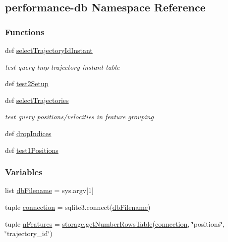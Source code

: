 \hypertarget{namespaceperformance-db}{\subsection{performance-\/db Namespace Reference}
\label{namespaceperformance-db}
}
\subsubsection*{Functions}
\begin{DoxyCompactItemize}
\item 
def \hyperlink{namespaceperformance-db_ac6a284a717787bb2e2296d0caed4918c}{select\-Trajectory\-Id\-Instant}
\begin{DoxyCompactList}\small\item\em test query tmp trajectory instant table \end{DoxyCompactList}\item 
def \hyperlink{namespaceperformance-db_a90fd7556b57603a7d6b053fca334b2ba}{test2\-Setup}
\item 
def \hyperlink{namespaceperformance-db_ac263eb3c8de7eb683d43f0dc6554c7ec}{select\-Trajectories}
\begin{DoxyCompactList}\small\item\em test query positions/velocities in feature grouping \end{DoxyCompactList}\item 
def \hyperlink{namespaceperformance-db_a0a1e5bdd6869001c58701fed27c1a2cd}{drop\-Indices}
\item 
def \hyperlink{namespaceperformance-db_abc61c091eb9ceede04cb3a27f0b774aa}{test1\-Positions}
\end{DoxyCompactItemize}
\subsubsection*{Variables}
\begin{DoxyCompactItemize}
\item 
list \hyperlink{namespaceperformance-db_a283e8388225ac72bea1f9a5b9b7f5ba9}{db\-Filename} = sys.\-argv\mbox{[}1\mbox{]}
\item 
tuple \hyperlink{namespaceperformance-db_ad99932ac08836faca786064c2cc433ee}{connection} = sqlite3.\-connect(\hyperlink{namespaceperformance-db_a283e8388225ac72bea1f9a5b9b7f5ba9}{db\-Filename})
\item 
tuple \hyperlink{namespaceperformance-db_a0de70b5896e44e6b32b6032bdce46af6}{n\-Features} = \hyperlink{namespacestorage_acb15e4489aa98d2fd2e32b16bc117757}{storage.\-get\-Number\-Rows\-Table}(\hyperlink{namespaceperformance-db_ad99932ac08836faca786064c2cc433ee}{connection}, \char`\"{}positions\char`\"{}, \char`\"{}trajectory\-\_\-id\char`\"{})
\end{DoxyCompactItemize}


